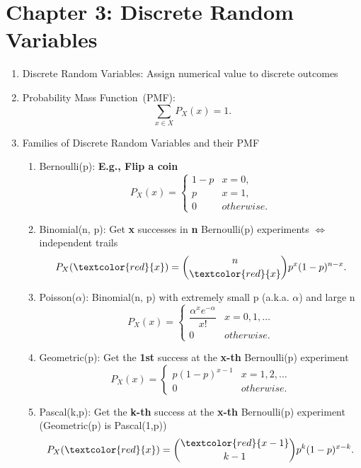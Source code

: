 \section*{Chapter 3: Discrete Random Variables}
\begin{enumerate}
    \item Discrete Random Variables: Assign numerical value to discrete outcomes
    \item Probability Mass Function~(PMF): \[\sum_{x\in X}P_X(x)=1.\] 
    \item Families of Discrete Random Variables and their PMF{
        \begin{enumerate}
            \item Bernoulli(p): \textbf{E.g., Flip a coin}{
                \[ P_X(x) = 
                \begin{cases}
                    1-p & x=0, \\
                    p   & x=1, \\
                    0   & otherwise.
                \end{cases} \]
            }
            \item Binomial(n, p): Get \textbf{x} successes in \textbf{n} Bernoulli(p) experiments $\iff$ independent trails{
                \[P_X(\textcolor{red}{x}) = \binom{n}{\textcolor{red}{x}}p^x(1-p)^{n-x}.\]
            }
            \item Poisson($\alpha$): Binomial(n, p) with extremely small p (a.k.a. $\alpha$) and large n{
                \[ P_X(x) = 
                \begin{cases}
                    \dfrac{\alpha^xe^{-\alpha}}{x!}   & x=0,1,\ldots \\
                    0   & otherwise.
                \end{cases} \]
            }
            \item Geometric(p): Get the \textbf{1st} success at the \textbf{x-th} Bernoulli(p) experiment {
                \[ P_X(x) = 
                \begin{cases}
                    p(1-p)^{x-1} & x=1,2,\ldots \\
                    0   & otherwise.
                \end{cases} \]
            }
            \item Pascal(k,p): Get the \textbf{k-th} success at the \textbf{x-th} Bernoulli(p) experiment (Geometric(p) is Pascal(1,p)){
                \[P_X(\textcolor{red}{x}) = \binom{\textcolor{red}{x-1}}{k-1}p^k(1-p)^{x-k}.\]
}
\end{enumerate}}
\end{enumerate}

